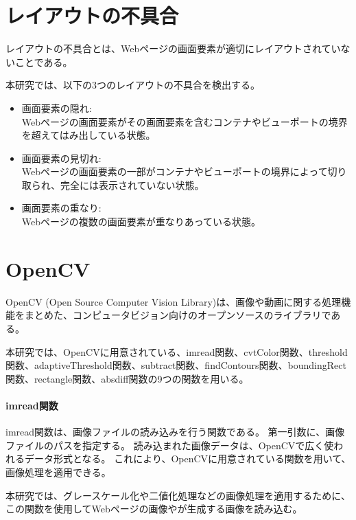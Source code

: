 \section{レイアウトの不具合}\label{sec:layout effect}
レイアウトの不具合とは、Webページの画面要素が適切にレイアウトされていないことである\cite{LayoutFailureDetection}。
\par
本研究では、以下の3つのレイアウトの不具合を検出する。
\begin{itemize}
      \setlength{\itemsep}{0pt}
            \setlength{\parsep}{0pt}
      \item 画面要素の隠れ:\\
            Webページの画面要素がその画面要素を含むコンテナやビューポートの境界を超えてはみ出している状態。
      \item 画面要素の見切れ:\\
            Webページの画面要素の一部がコンテナやビューポートの境界によって切り取られ、完全には表示されていない状態。
      \item 画面要素の重なり:\\
            Webページの複数の画面要素が重なりあっている状態。
\end{itemize}
\section{OpenCV}\label{sec:opencv}
OpenCV (Open Source Computer Vision Library)\cite{OpenCV}は、画像や動画に関する処理機能をまとめた、コンピュータビジョン向けのオープンソースのライブラリである。
\par
本研究では、OpenCVに用意されている、imread関数、cvtColor関数、threshold関数、adaptiveThreshold関数、subtract関数、findContours関数、boundingRect関数、rectangle関数、absdiff関数の9つの関数を用いる。

\paragraph{imread関数}
imread関数は、画像ファイルの読み込みを行う関数である。
第一引数に、画像ファイルのパスを指定する。
読み込まれた画像データは、OpenCVで広く使われるデータ形式となる。
これにより、OpenCVに用意されている関数を用いて、画像処理を適用できる。
\par
本研究では、グレースケール化や二値化処理などの画像処理を適用するために、
この関数を使用してWebページの画像や\toolName が生成する画像を読み込む。
